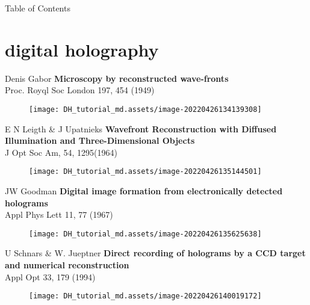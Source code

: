\documentclass[t, aspectratio=169]{beamer}
\begin{document}
\begin{frame}[allowframebreaks]{Table of Contents}
	\tableofcontents[hideallsubsections]
\end{frame}


\section{digital holography}
\begin{frame}[c]
\centering\LARGE\textbf{\secname}
\end{frame}

\begin{frame}{Denis Gabor}
	\textbf{Microscopy by reconstructed wave-fronts}\\
	Proc. Royql Soc London 197, 454 (1949)

	\begin{figure}
		\texttt{[image: DH\_tutorial\_md.assets/image-20220426134139308]}
	\end{figure}

\end{frame}


\begin{frame}{E N Leigth \& J Upatnieks}
	\textbf{Wavefront Reconstruction with Diffused Illumination and Three-Dimensional Objects}\\
	J Opt Soc Am, 54, 1295(1964)

	\begin{figure}
		\texttt{[image: DH\_tutorial\_md.assets/image-20220426135144501]}
	\end{figure}

\end{frame}


\begin{frame}{JW Goodman}
	\textbf{Digital image formation from electronically detected holograms}\\
	Appl Phys Lett 11, 77 (1967)

	\begin{figure}
		\texttt{[image: DH\_tutorial\_md.assets/image-20220426135625638]}
	\end{figure}

\end{frame}


\begin{frame}{U Schnars \& W. Jueptner}
	\textbf{Direct recording of holograms by a CCD target and numerical reconstruction}\\
	Appl Opt 33, 179 (1994)

	\begin{figure}
		\texttt{[image: DH\_tutorial\_md.assets/image-20220426140019172]}
	\end{figure}

\end{frame}
\end{document}
